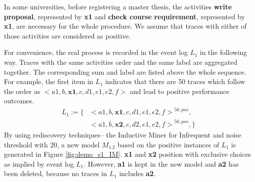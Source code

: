 In some universities, before registering a master thesis, the activities \textbf{write proposal}, represented by \textbf{x1}  and \textbf{check course requirement}, represented by \textbf{x1}, are necessary for the whole procedure. We assume that traces with either of those activities are considered as positive.  

For convenience, the real process is recorded in the event log $L_1$ in the following way. Traces with the same activities order and the same label are aggregated together. The corresponding sum and label are listed above the whole sequence. For example, the first item in $L_1$ indicates that there are 50 traces which follow the order as ${<a1, b, \textbf{x1},c, d1, e1, e2, f>}$ and lead to positive performance outcomes.
\begin{align*}
		L_1:= \{ &  {<a1, b, \textbf{x1},c, d1, e1, e2, f>}^{50, pos}, \\   
		  &{<a1, b, \textbf{x2},c, d2, e1, e2, f>}^{50,pos},
		\}
		\end{align*}
By using rediscovery techniques-- the Inductive Miner for Infrequent and noise threshold with 20, a new  model $M_{1.2}$ based on the positive instances of $L_1$ is generated in Figure \ref{fig:demo_s1_IM}. \textbf{x1} and \textbf{x2} position with exclusive choices as implied by event log $L_1$. However, \textbf{a1} is kept in the new model and \textbf{a2} has been deleted, because no traces in $L_1$ includes \textbf{a2}.
		
